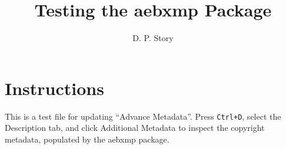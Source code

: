 \documentclass{article}
\title{Testing the aebxmp Package}
\author{D. P. Story}
\begin{document}
\maketitle

\section{Instructions}

This is a test file for updating ``Advance Metadata''. Press
\texttt{Ctrl+D}, select the \textsf{Description} tab, and click
\textsf{Additional Metadata} to inspect the copyright metadata,
populated by the \textsf{aebxmp} package.
\end{document}

